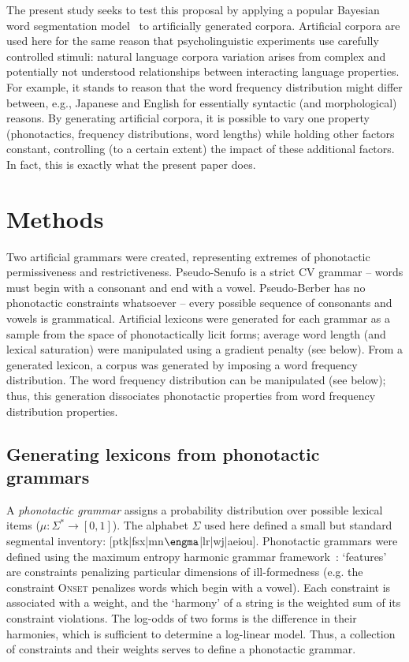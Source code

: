 \documentclass[11pt]{article}
\begin{document}
The present study seeks to test this proposal by applying a popular Bayesian word segmentation model~\cite{Brent99a,Goldwater07c,Goldwater09a} to artificially generated corpora. Artificial corpora are used here for the same reason that psycholinguistic experiments use carefully controlled stimuli: natural language corpora variation arises from complex and potentially not understood relationships between interacting language properties. For example, it stands to reason that the word frequency distribution might differ between, e.g., Japanese and English for essentially syntactic (and morphological) reasons. By generating artificial corpora, it is possible to vary one property (phonotactics, frequency distributions, word lengths) while holding other factors constant, controlling (to a certain extent) the impact of these additional factors. In fact, this is exactly what the present paper does.

\section{Methods}
Two artificial grammars were created, representing extremes of phonotactic permissiveness and restrictiveness. Pseudo-Senufo is a strict CV grammar -- words must begin with a consonant and end with a vowel.
Pseudo-Berber has no phonotactic constraints whatsoever -- every possible sequence of consonants and vowels is grammatical. Artificial lexicons were generated for each grammar as a sample from the space of phonotactically licit forms; average word length (and lexical saturation) were manipulated using a gradient penalty (see below). From a generated lexicon, a corpus was generated by imposing a word frequency distribution. The word frequency distribution can be manipulated (see below); thus, this generation dissociates phonotactic properties from word frequency distribution properties.
 
\subsection{Generating lexicons from phonotactic grammars}

A \textit{phonotactic grammar} assigns a probability distribution over possible lexical items ($\mu : \Sigma^* \rightarrow [0,1]$). The alphabet $\Sigma$ used here defined a small but standard segmental inventory: [ptk|fsx|mn$\engma$|lr|wj|aeiou]. Phonotactic grammars were defined using the maximum entropy harmonic grammar framework~\cite{Hayes08a}: `features' are constraints penalizing particular dimensions of ill-formedness (e.g. the constraint \textsc{Onset} penalizes words which begin with a vowel). Each constraint is associated with a weight, and the `harmony' of a string is the weighted sum of its constraint violations. The log-odds of two forms is the difference in their harmonies, which is sufficient to determine a log-linear model. Thus, a collection of constraints and their weights serves to define a phonotactic grammar.
\end{document}
